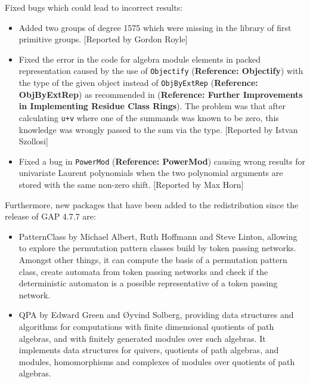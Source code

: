 \documentclass[a4paper,11pt]{report}
\begin{document}
{ Fixed bugs which could lead to incorrect results: 
\begin{itemize}
\item  Added two groups of degree 1575 which were missing in the library of first
primitive groups. [Reported by Gordon Royle] 
\item  Fixed the error in the code for algebra module elements in packed
representation caused by the use of \texttt{Objectify} (\textbf{Reference: Objectify}) with the type of the given object instead of \texttt{ObjByExtRep} (\textbf{Reference: ObjByExtRep}) as recommended in  (\textbf{Reference: Further Improvements in Implementing Residue Class Rings}). The problem was that after calculating \texttt{u+v} where one of the summands was known to be zero, this knowledge was wrongly
passed to the sum via the type. [Reported by Istvan Szollosi] 
\item  Fixed a bug in \texttt{PowerMod} (\textbf{Reference: PowerMod}) causing wrong results for univariate Laurent polynomials when the two
polynomial arguments are stored with the same non-zero shift. [Reported by Max
Horn] 
\end{itemize}
 Furthermore, new packages that have been added to the redistribution since the
release of \textsf{GAP} 4.7.7 are: 
\begin{itemize}
\item  \textsf{PatternClass} by Michael Albert, Ruth Hoffmann and Steve Linton, allowing to explore the
permutation pattern classes build by token passing networks. Amongst other
things, it can compute the basis of a permutation pattern class, create
automata from token passing networks and check if the deterministic automaton
is a possible representative of a token passing network. 
\item  \textsf{QPA} by Edward Green and {\O}yvind Solberg, providing data structures and
algorithms for computations with finite dimensional quotients of path
algebras, and with finitely generated modules over such algebras. It
implements data structures for quivers, quotients of path algebras, and
modules, homomorphisms and complexes of modules over quotients of path
algebras. 
\end{itemize}
 }

    
\end{document}
